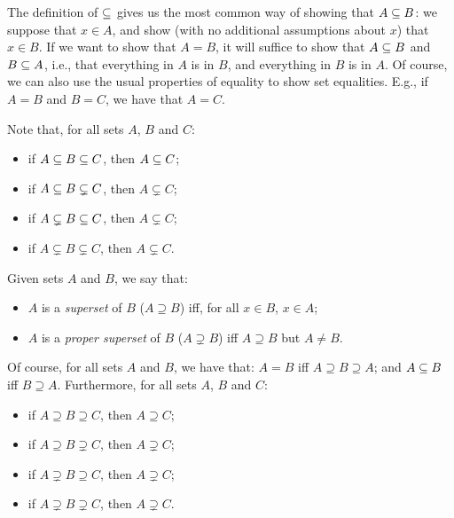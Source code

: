 The definition of $\subseteq$ gives us the most common way of showing that
$A\subseteq B$: we suppose that $x\in A$, and show (with no additional
assumptions about $x$) that $x\in B$.  If we want to show that $A=B$,
it will suffice to show that $A\subseteq B$ and $B\subseteq A$, i.e., that
everything in $A$ is in $B$, and everything in $B$ is in $A$.  Of
course, we can also use the usual properties of equality to show set
equalities.  E.g., if $A=B$ and $B=C$, we have that $A=C$.

Note that, for all sets $A$, $B$ and $C$:
\begin{itemize}
\item if $A\subseteq B\subseteq C$, then $A\subseteq C$;

\item if $A\subseteq B\subsetneq C$, then $A\subsetneq C$;

\item if $A\subsetneq B\subseteq C$, then $A\subsetneq C$;

\item if $A\subsetneq B\subsetneq C$, then $A\subsetneq C$.
\end{itemize}

Given sets $A$ and $B$, we say that:
\begin{itemize}
\item $A$ is a \emph{superset}
%
%
of $B$ ($A\supseteq B$)
%
%
iff, for all $x\in B$, $x\in A$;

\item $A$ is a
\emph{proper superset}
%
%
%
of $B$ ($A\supsetneq B$)
%
%
iff $A\supseteq B$ but $A\neq B$.
\end{itemize}
Of course, for all sets $A$ and $B$, we have that:
$A=B$ iff $A\supseteq B\supseteq A$; and $A\subseteq B$ iff $B\supseteq A$.
Furthermore, for all sets $A$, $B$ and $C$:
\begin{itemize}
\item if $A\supseteq B\supseteq C$, then $A\supseteq C$;

\item if $A\supseteq B\supsetneq C$, then $A\supsetneq C$;

\item if $A\supsetneq B\supseteq C$, then $A\supsetneq C$;

\item if $A\supsetneq B\supsetneq C$, then $A\supsetneq C$.
\end{itemize}

